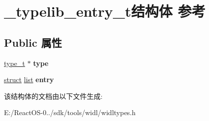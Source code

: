 \hypertarget{struct__typelib__entry__t}{}\section{\+\_\+typelib\+\_\+entry\+\_\+t结构体 参考}
\label{struct__typelib__entry__t}
\subsection*{Public 属性}
\begin{DoxyCompactItemize}
\item 
\mbox{\label{struct__typelib__entry__t_a2e698ad3dbabd954e8700b8f18a9fe93}} 
\hyperlink{struct__type__t}{type\+\_\+t} $\ast$ {\bfseries type}
\item 
\mbox{\label{struct__typelib__entry__t_aa34165a5fa4a25fe2f1fe4e1ac1621e1}} 
\hyperlink{interfacestruct}{struct} \hyperlink{classlist}{list} {\bfseries entry}
\end{DoxyCompactItemize}


该结构体的文档由以下文件生成\+:\begin{DoxyCompactItemize}
\item 
E\+:/\+React\+O\+S-\/0../sdk/tools/widl/widltypes.\+h\end{DoxyCompactItemize}
